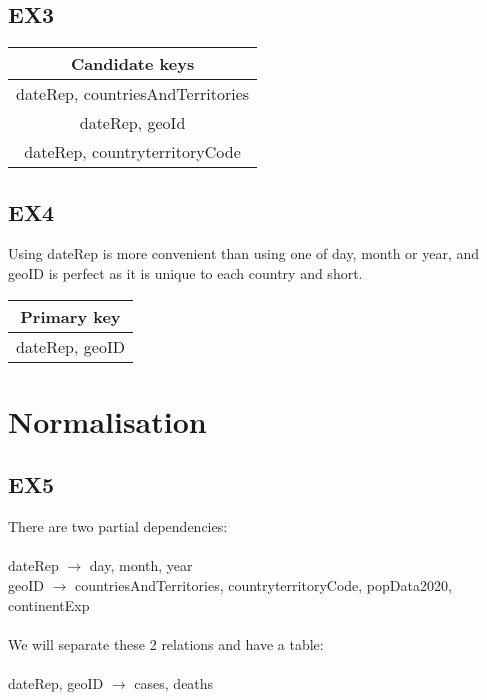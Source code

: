 \documentclass{article}
\begin{document}
\pagebreak
\subsection{EX3}
\begin{table}[h]
 \begin{tabular}{|c|} 
  \hline
  \textbf{Candidate keys} \\ [1ex]
  \hline 
  dateRep, countriesAndTerritories\\ [1ex]
  dateRep, geoId\\ [1ex]
  dateRep, countryterritoryCode\\ [1ex]
  \hline
 \end{tabular}
\end{table}

\subsection{EX4}
Using dateRep is more convenient than using one of day, month or year, and geoID is perfect as it is unique to each country and short.
\begin{table}[h]
\begin{tabular}{|c|}
\hline
\textbf{Primary key} \\ [1ex]
\hline
dateRep, geoID\\ [1ex] 
\hline
\end{tabular}
\end{table}

\section{Normalisation}
\subsection{EX5}
There are two partial dependencies: \\
\\
dateRep $\to$ day, month, year\\
geoID $\to$ countriesAndTerritories, countryterritoryCode, popData2020, continentExp \\
\\
We will separate these 2 relations and have a table:\\
\\
dateRep, geoID $\to$ cases, deaths
\end{document}
